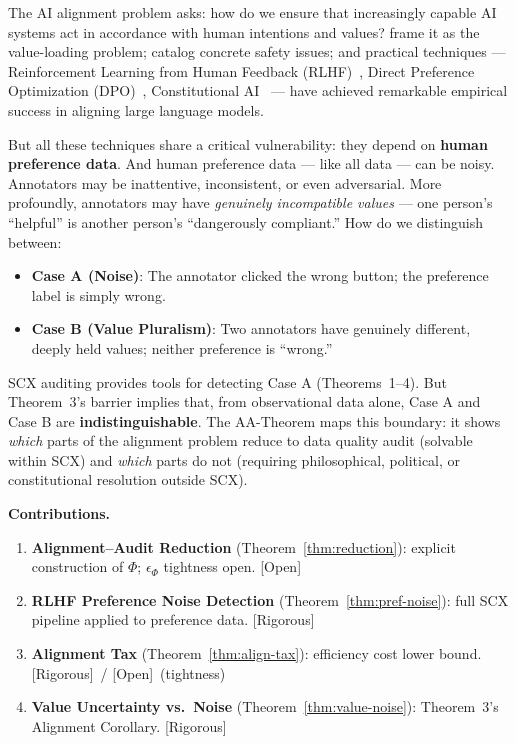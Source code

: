 \documentclass[12pt,a4paper]{article}
\newcommand{\rigorous}{\textcolor{green!50!black}{\small\textsf{[Rigorous]}}}
\newcommand{\openquest}{\textcolor{red!70!black}{\small\textsf{[Open]}}}
\begin{document}
The AI alignment problem asks: how do we ensure that increasingly capable AI
systems act in accordance with human intentions and values?
\citet{russell2019human} frame it as the value-loading problem;
\citet{amodei2016concrete} catalog concrete safety issues; and practical
techniques — Reinforcement Learning from Human Feedback
(RLHF)~\citep{christiano2017deep}, Direct Preference Optimization
(DPO)~\citep{rafailov2024direct}, Constitutional AI~\citep{bai2022constitutional}
— have achieved remarkable empirical success in aligning large language models.

But all these techniques share a critical vulnerability: they depend on
\textbf{human preference data}.  And human preference data — like all data —
can be noisy.  Annotators may be inattentive, inconsistent, or even
adversarial.  More profoundly, annotators may have \emph{genuinely
incompatible values} — one person's ``helpful'' is another person's
``dangerously compliant.''  How do we distinguish between:
\begin{itemize}
    \item \textbf{Case A (Noise)}: The annotator clicked the wrong button;
          the preference label is simply wrong.
    \item \textbf{Case B (Value Pluralism)}: Two annotators have genuinely
          different, deeply held values; neither preference is ``wrong.''
\end{itemize}

SCX auditing provides tools for detecting Case A (Theorems~1--4).  But
Theorem~3's barrier implies that, from observational data alone, Case A and
Case B are \textbf{indistinguishable}.  The AA-Theorem maps this boundary: it
shows \emph{which} parts of the alignment problem reduce to data quality audit
(solvable within SCX) and \emph{which} parts do not (requiring philosophical,
political, or constitutional resolution outside SCX).

\medskip\noindent
\textbf{Contributions.}
\begin{enumerate}[label=(\arabic*)]
    \item \textbf{Alignment--Audit Reduction} (Theorem~\ref{thm:reduction}):
          explicit construction of $\Phi$; $\epsilon_\Phi$ tightness open.
          \openquest
    \item \textbf{RLHF Preference Noise Detection} (Theorem~\ref{thm:pref-noise}):
          full SCX pipeline applied to preference data.  \rigorous
    \item \textbf{Alignment Tax} (Theorem~\ref{thm:align-tax}):
          efficiency cost lower bound.  \rigorous~/ \openquest~(tightness)
    \item \textbf{Value Uncertainty vs.\ Noise} (Theorem~\ref{thm:value-noise}):
          Theorem~3's Alignment Corollary.  \rigorous
\end{enumerate}
\end{document}
